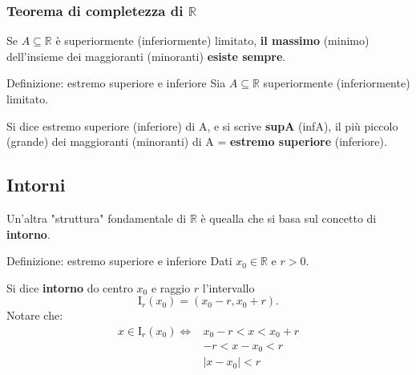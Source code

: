 \documentclass[x11names]{article}
\begin{document}
		\begin{center}
		\colorbox{myred}{\begin{minipage}{5.75in}
				\begin{redes}{}
					\subsubsection{Teorema di completezza di $\mathbb{R}$}
					Se $A \subseteq \mathbb{R}$ è superiormente (inferiormente) limitato, \textbf{il massimo} (minimo) dell'insieme  dei maggioranti (minoranti) \textbf{esiste sempre}.
				\end{redes}
				\end{minipage}}        
		\end{center}
	\begin{center}
		\colorbox{myblue}{\begin{minipage}{5.75in}
				\begin{blues}{Definizione: estremo superiore e inferiore}
				Sia $A \subseteq \mathbb{R}$  superiormente (inferiormente) limitato.
				
				Si dice estremo superiore (inferiore) di A, e si scrive \textbf{supA} (infA), il più piccolo (grande) dei maggioranti (minoranti) di A = \textbf{estremo superiore} (inferiore).
				\end{blues}
		\end{minipage}}       
	\end{center}
	\subsection{Intorni}
	Un'altra  "struttura" fondamentale di $\mathbb{R}$ è quealla che si basa sul concetto di \textbf{intorno}.
	
	\begin{center}
		\colorbox{myblue}{\begin{minipage}{5.75in}
				\begin{blues}{Definizione: estremo superiore e inferiore}
					Dati $x_0 \in \mathbb{R}$ e $r > 0$.
					
					Si dice \textbf{intorno} do centro $x_0$ e raggio $r$ l'intervallo 
					\[
					\text{I}_r (x_0) = (x_0 -r, x_0 +r)
					.\]
					Notare che:
					\begin{align*}
						x \in \text{I}_r(x_0) \Longleftrightarrow & x_0 - r < x < x_0 + r \\
						& - r < x -x_0 < r \\
						& |x-x_0| < r
					\end{align*}
					
					
				\end{blues}
		\end{minipage}}       
	\end{center}
	
\end{document}
